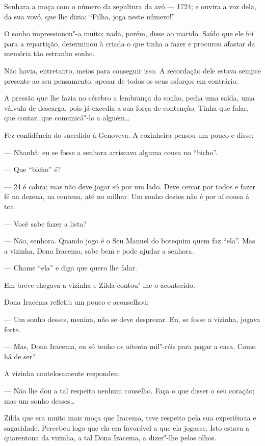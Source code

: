 Sonhara a moça com o número da sepultura da avó --- 1724; e ouvira a voz
dela, da sua vovó, que lhe dizia: ``Filha, joga neste número!''

O sonho impressionou"-a muito; nada, porém, disse ao marido. Saído que
ele foi para a repartição, determinou à criada o que tinha a fazer e
procurou afastar da memória tão estranho sonho.

Não havia, entretanto, meios para conseguir isso. A recordação dele
estava sempre presente ao seu pensamento, apesar de todos os seus
esforços em contrário.

A pressão que lhe fazia no cérebro a lembrança do sonho, pedia uma
saída, uma válvula de descarga, pois já excedia a sua força de
contenção. Tinha que falar, que contar, que comunicá"-lo a alguém\ldots{}

Fez confidência do sucedido à Genoveva. A cozinheira pensou um pouco e
disse:

--- Nhanhã: eu se fosse a senhora arriscava alguma cousa no ``bicho''.

--- Que ``bicho'' é?

--- 24 é cabra; mas não deve jogar só por um lado. Deve cercar por todos
e fazer fé na dezena, na centena, até no milhar. Um sonho destes não é
por aí cousa à toa.

--- Você sabe fazer a lista?

--- Não, senhora. Quando jogo é o Seu Manuel do botequim quem faz
``ela''. Mas a vizinha, Dona Iracema, sabe bem e pode ajudar a senhora.

--- Chame ``ela'' e diga que quero lhe falar.

Em breve chegava a vizinha e Zilda contou"-lhe o acontecido.

Dona Iracema refletiu um pouco e aconselhou:

--- Um sonho desses, menina, não se deve desprezar. Eu, se fosse a
vizinha, jogava forte.

--- Mas, Dona Iracema, eu só tenho os oitenta mil"-réis para pagar a casa.
Como há de ser?

A vizinha cautelosamente respondeu:

--- Não lhe dou a tal respeito nenhum conselho. Faça o que disser o seu
coração; mas um sonho desses\ldots{}

Zilda que era muito mais moça que Iracema, teve respeito pela sua
experiência e sagacidade. Percebeu logo que ela era favorável a que ela
jogasse. Isto estava a quarentona da vizinha, a tal Dona Iracema, a
dizer"-lhe pelos olhos.

